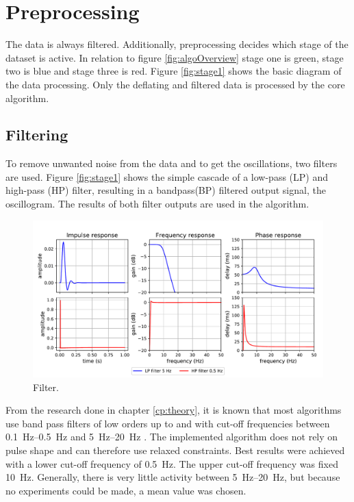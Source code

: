\section{Preprocessing}
The data is always filtered. Additionally, preprocessing decides which stage of the dataset is active. In relation to figure \ref{fig:algoOverview} stage one is green, stage two is blue and stage three is red. Figure \ref{fig:stage1} shows the basic diagram of the data processing. Only the deflating and filtered data is processed by the core algorithm. 

\subsection{Filtering}\label{sec:filt}
To remove unwanted noise from the data and to get the oscillations, two filters are used. Figure \ref{fig:stage1} shows the simple cascade of a low-pass (LP) and high-pass (HP) filter, resulting in a bandpass(BP) filtered output signal, the oscillogram. The results of both filter outputs are used in the algorithm.
%

\begin{figure}[ht]
\centering
\includegraphics[width=\textwidth]{figures/filter.pdf}
\caption{Filter.}
\label{fig:filters}
\end{figure}

From the research done in chapter \ref{cp:theory}, it is known that most algorithms use band pass filters of low orders up to  and with cut-off frequencies between \SIrange{0.1}{0.5}{\Hz} and \SIrange{5}{20}{\Hz} \citep{Forouzanfar2015}. The implemented algorithm does not rely on pulse shape and can therefore use relaxed constraints. Best results were achieved with a lower cut-off frequency of \SI{0.5}{\Hz}. The upper cut-off frequency was fixed \SI{10}{\Hz}. Generally, there is very little activity between \SIrange{5}{20}{\Hz}, but because no experiments could be made, a mean value was chosen. 

